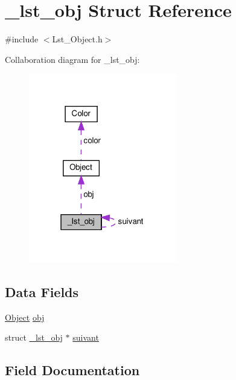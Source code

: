 \hypertarget{struct__lst__obj}{}\section{\+\_\+lst\+\_\+obj Struct Reference}
\label{struct__lst__obj}


{\ttfamily \#include $<$Lst\+\_\+\+Object.\+h$>$}



Collaboration diagram for \+\_\+lst\+\_\+obj\+:\nopagebreak
\begin{figure}[H]
\begin{center}
\leavevmode
\includegraphics[width=183pt]{struct__lst__obj__coll__graph}
\end{center}
\end{figure}
\subsection*{Data Fields}
\begin{DoxyCompactItemize}
\item 
\hyperlink{struct_object}{Object} \hyperlink{struct__lst__obj_a3a6f22968f6ad522baa85c809b856bae}{obj}
\item 
struct \hyperlink{struct__lst__obj}{\+\_\+lst\+\_\+obj} $\ast$ \hyperlink{struct__lst__obj_a30057e853c9335659e7e45f3052ca333}{suivant}
\end{DoxyCompactItemize}


\subsection{Field Documentation}
\mbox{\label{struct__lst__obj_a3a6f22968f6ad522baa85c809b856bae}} 
